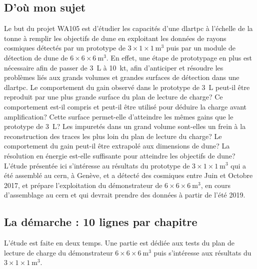 \subsection{D'où mon sujet}
Le but du projet WA105 est d'étudier les capacités d'une \gls{dlartpc} à l'échelle de la tonne à remplir les objectifs de \gls{dune} en exploitant les données de rayons cosmiques détectés par un prototype de $3\times1\times\SI{1}{\meter^3}$ puis par un module de détection de \gls{dune} de $6\times6\times\SI{6}{\meter^3}$. En effet, une étape de prototypage en plus est nécessaire afin de passer de \SI{3}{\liter} à \SI{10}{\kilo\tonne}, afin d'anticiper et résoudre les problèmes liés aux grands volumes et grandes surfaces de détection dans une \gls{dlartpc}. Le comportement du gain observé dans le prototype de \SI{3}{\liter} peut-il être reproduit par une plus grande surface du plan de lecture de charge? Ce comportement est-il compris et peut-il être utilisé pour déduire la charge avant amplification? Cette surface permet-elle d'atteindre les mêmes gains que le prototype  de \SI{3}{\liter}? Les impuretés dans un grand volume sont-elles un frein à la reconstruction des traces les plus loin du plan de lecture du charge? Le comportement du gain peut-il être extrapolé aux dimensions de \gls{dune}? La résolution en énergie est-elle suffisante pour atteindre les objectifs de \gls{dune}? L'étude présentée ici s'intéresse au résultats du prototype de $3\times1\times\SI{1}{\meter^3}$ qui a été assemblé au \gls{cern}, à Genève, et a détecté des cosmiques entre Juin et Octobre 2017, et prépare l'exploitation du démonstrateur de $6\times6\times\SI{6}{\meter^3}$, en cours d'assemblage au \gls{cern} et qui devrait prendre des données à partir de l'été 2019.

\subsection{La démarche : 10 lignes par chapitre}
L'étude est faite en deux temps. Une partie est dédiée aux tests du plan de lecture de charge du démonstrateur $6\times6\times\SI{6}{\meter^3}$ puis s'intéresse aux résultats du $3\times1\times\SI{1}{\meter^3}$.

